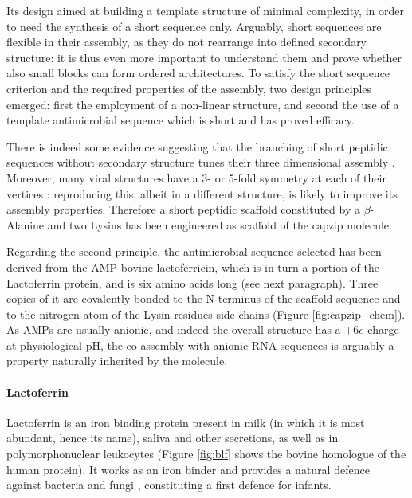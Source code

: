 Its design aimed at building a template structure of minimal complexity, in order to need the synthesis of a short sequence only. Arguably, short sequences are flexible in their assembly, as they do not rearrange into defined secondary structure: it is thus even more important to understand them and prove whether also small blocks can form ordered architectures.
%
To satisfy the short sequence criterion and the required properties of the assembly, two design principles emerged: first the employment of a non-linear structure, and second the use of a template antimicrobial sequence which is short and has proved efficacy.

There is indeed some evidence suggesting that the branching of short peptidic sequences without secondary structure tunes their three dimensional assembly \citep{Gudlur2012,Breger2017,Zhao2018branch}. Moreover, many viral structures have a 3- or 5-fold symmetry at each of their vertices \citep{Schoonen2014}: reproducing this, albeit in a different structure, is likely to improve its assembly properties.
%
Therefore a short peptidic scaffold constituted by a $\beta$-Alanine and two Lysins has been engineered as scaffold of the capzip molecule.

Regarding the second principle, the antimicrobial sequence selected has been derived from the AMP bovine lactoferricin, which is in turn a portion of the Lactoferrin protein, and is six amino acids long (see next paragraph).
%
Three copies of it are covalently bonded to the N-terminus of the scaffold sequence and to the nitrogen atom of the Lysin residues side chains (Figure \ref{fig:capzip_chem}).
%
As AMPs are usually anionic, and indeed the overall structure has a $+6e$ charge at physiological pH, the co-assembly with anionic RNA sequences is arguably a property naturally inherited by the molecule.


\paragraph{Lactoferrin} Lactoferrin is an iron binding protein present in milk (in which it is most abundant, hence its name), saliva and other secretions, as well as in polymorphonuclear leukocytes (Figure \ref{fig:blf} shows the bovine homologue of the human protein).
%
It works as an iron binder and provides a natural defence against bacteria and fungi \citep{Sanchez1992,Arnold1977,Arnold1980,Kirkpatrick1971,Jahani2015}, constituting a first defence for infants.

